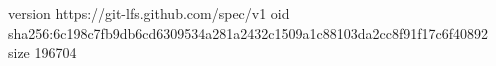 version https://git-lfs.github.com/spec/v1
oid sha256:6c198c7fb9db6cd6309534a281a2432c1509a1c88103da2cc8f91f17c6f40892
size 196704
